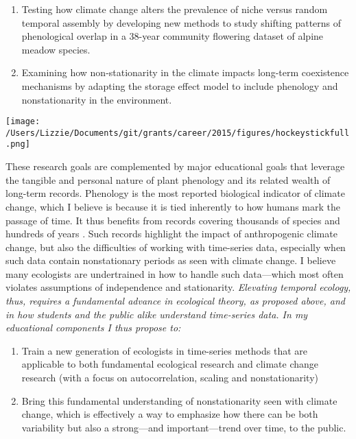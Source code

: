 \documentclass[12pt,a4paper,oneside]{article}
\begin{document}
\begin{enumerate}
\item Testing how climate change alters the prevalence of niche versus random temporal assembly by developing new methods to study shifting patterns of phenological overlap in a 38-year community flowering dataset of alpine meadow species. %
\item Examining how non-stationarity in the climate impacts long-term coexistence mechanisms by adapting the storage effect model to include phenology and nonstationarity in the environment.
\end{enumerate}
\begin{center}
\texttt{[image: /Users/Lizzie/Documents/git/grants/career/2015/figures/hockeystickfull.png]}
\end{center}
These research goals are complemented by major educational goals that leverage the tangible and personal nature of plant phenology and its related wealth of long-term records. Phenology is the most reported biological indicator of climate change, which I believe is because it is tied inherently to how humans mark the passage of time. It thus benefits from records covering thousands of species and hundreds of years \citep{Chuine:2004fk,tansley}. Such records highlight the impact of anthropogenic climate change, but also the difficulties of working with time-series data, especially when such data contain nonstationary periods as seen with climate change. I believe many ecologists are undertrained in how to handle such data---which most often violates assumptions of independence and stationarity. \emph{Elevating temporal ecology, thus, requires a fundamental advance in ecological theory, as proposed above, and in how students and the public alike understand time-series data. In my educational components I thus propose to:}
\begin{enumerate}
\itemsep 0em
\item Train a new generation of ecologists in time-series methods that are applicable to both fundamental ecological research and climate change research (with a focus on autocorrelation, scaling and nonstationarity)
\item Bring this fundamental understanding of nonstationarity seen with climate change, which is effectively a way to emphasize how there can be both variability but also a strong---and important---trend over time, to the public. 
\end{enumerate}
\end{document}
